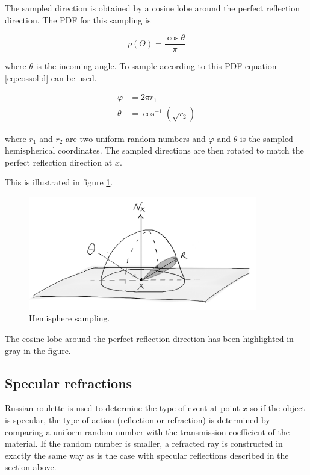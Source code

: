 \documentclass[a4paper]{report}
\begin{document}
The sampled direction is obtained by a cosine lobe around the perfect
reflection direction. The PDF for this sampling is

\begin{equation}
  p(\Theta) = \frac{\cos{\theta}}{\pi}
\end{equation}

where \(\theta\) is the incoming angle. To sample according to this
PDF equation \ref{eq:cossolid} can be used.

\begin{align}
  \varphi &= 2 \pi r_1 \nonumber \\
  \theta &= \cos^{-1}(\sqrt{r_2})
  \label{eq:cossolid}
\end{align}

where \(r_1\) and \(r_2\) are two uniform random numbers and
\(\varphi\) and \(\theta\) is the sampled hemispherical coordinates. The sampled
directions are then rotated to match the perfect reflection direction
at \(x\).

This is illustrated in figure \ref{fig:hemsample}.

\begin{figure}[h]
  \centering
  \includegraphics[width=10cm]{figures/6}
  \caption{Hemisphere sampling.}
  \label{fig:hemsample}
\end{figure}

The cosine lobe around the perfect reflection direction has been highlighted in gray in the figure.  

\subsection{Specular refractions}

Russian roulette is used to determine the type of event at point \(x\)
so if the object is specular, the type of action (reflection or
refraction) is determined by comparing a uniform random number with
the transmission coefficient of the material. If the random number is
smaller, a refracted ray is constructed in exactly the same way as is
the case with specular reflections described in the section above.
\end{document}
